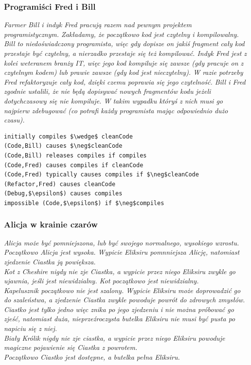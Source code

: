 \documentclass{article}
\begin{document}
\subsubsection{Programiści Fred i Bill}


\textit{Farmer Bill i indyk Fred pracują razem nad pewnym projektem programistycznym. Zakładamy, że początkowo kod jest czytelny i kompilowalny. Bill to niedoświadczony programista, więc gdy dopisze on jakiś fragment cały kod przestaje być czytelny, a nierzadko przestaje się też kompilować. Indyk Fred jest z kolei weteranem branży IT, więc jego kod kompiluje się zawsze (gdy pracuje on z czytelnym kodem) lub prawie zawsze (gdy kod jest nieczytelny). W razie potrzeby Fred refaktoryzuje cały kod, dzięki czemu poprawia się jego czytelność. Bill i Fred zgodnie ustalili, że nie będą dopisywać nowych fragmentów kodu jeżeli dotychczasowy się nie kompiluje. W takim wypadku któryś z nich musi go najpierw zdebugować (co potrafi każdy programista mając odpowiednio dużo czasu).}

\bigskip
{}
\begin{lstlisting}[mathescape=true]
initially compiles $\wedge$ cleanCode
(Code,Bill) causes $\neg$cleanCode
(Code,Bill) releases compiles if compiles
(Code,Fred) causes compiles if cleanCode
(Code,Fred) typically causes compiles if $\neg$cleanCode
(Refactor,Fred) causes cleanCode
(Debug,$\epsilon$) causes compiles
impossible (Code,$\epsilon$) if $\neg$compiles
\end{lstlisting}

\subsubsection{Alicja w krainie czarów}


\textit{Alicja może być pomniejszona, lub być swojego normalnego, wysokiego wzrostu. Początkowo Alicja jest wysoka. Wypicie Eliksiru pomnniejsza Alicję, natomiast zjedzenie Ciastka ją powiększa.
\\
Kot z Cheshire nigdy nie zje Ciastka, a wypicie przez niego Eliksiru zwykle go ujawnia, jeśli jest niewidzialny. Kot początkowo jest niewidzialny.
\\
Kapelusznik początkowo nie jest szalony. Wypicie Eliksiru może doprowadzić go do szaleństwa, a zjedzenie Ciastka zwykle powoduje powrót do zdrowych zmysłów.
\\
Ciastko jest tylko jedno więc znika po jego zjedzeniu i nie można próbować go zjeść, natomiast duża, nieprzeźroczysta butelka Eliksiru nie musi być pusta po napiciu się z niej.
\\
Biały Królik nigdy nie zje ciastka, a wypicie przez niego Eliksiru powoduje magiczne pojawienie się Ciastka z powrotem.
\\
Początkowo Ciastko jest dostępne, a butelka pełna Eliksiru.}
\end{document}
